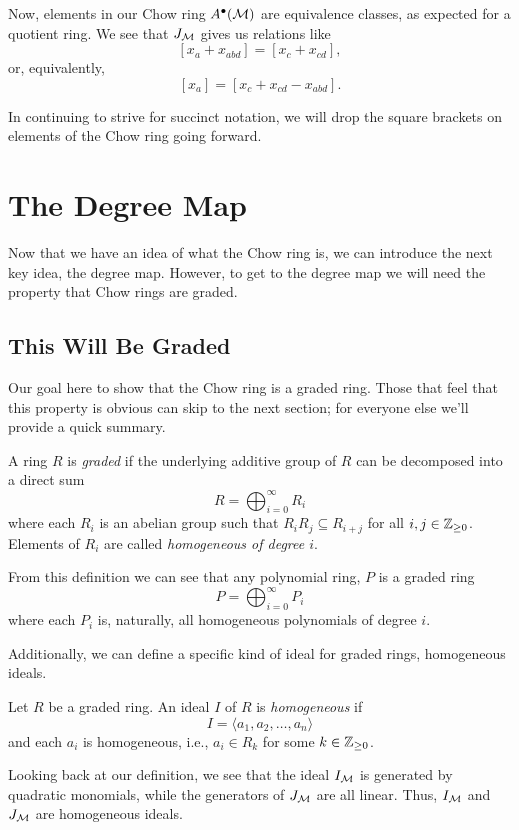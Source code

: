 \documentclass[12pt,oneside]{../../sfsuthesis}
\begin{document}
Now, elements in our Chow ring \( A^\bullet(\mathcal{M}) \) are equivalence classes, as expected for a quotient ring.
We see that \( J_{\mathcal{M}} \) gives us relations like
\[
    [x_a + x_{abd}] = [x_c + x_{cd}],
\]
or, equivalently,
\[
    [x_a] = [x_c + x_{cd} - x_{abd}].
\]

In continuing to strive for succinct notation, we will drop the square brackets on elements of the Chow ring going forward.

\section{The Degree Map}

Now that we have an idea of what the Chow ring is, we can introduce the next key idea, the degree map.
However, to get to the degree map we will need the property that Chow rings are graded.

\subsection{This Will Be Graded}
Our goal here to show that the Chow ring is a graded ring.
Those that feel that this property is obvious can skip to the next section; for everyone else we'll provide a quick summary.
\begin{definition}
    A ring \( R \) is \emph{graded} if the underlying additive group of \( R \) can be decomposed into a direct sum
    \[
        R = \bigoplus_{i=0}^\infty R_i
    \]
    where each \( R_i \) is an abelian group such that \( R_i R_j \subseteq R_{i+j} \) for all \( i, j \in \mathbb{Z}_{\geq 0}\).
    Elements of \( R_i \) are called \emph{homogeneous of degree \( i \)}.
\end{definition}
From this definition we can see that any polynomial ring, \( P \) is a graded ring
\[
    P =  \bigoplus_{i=0}^\infty P_i
\]
where each \( P_i \) is, naturally, all homogeneous polynomials of degree \( i \).

Additionally, we can define a specific kind of ideal for graded rings, homogeneous ideals.
\begin{definition}
    Let \( R \) be a graded ring. An ideal \( I \) of \( R \) is \emph{homogeneous} if
    \[
        I = \langle a_1, a_2, \dots, a_n \rangle
    \]
    and each \( a_i \) is homogeneous, i.e., \( a_i \in R_k \) for some \( k \in \mathbb{Z}_{\geq 0} \).
\end{definition}
Looking back at our definition, we see that the ideal \( I_{\mathcal{M}} \) is generated by quadratic monomials, while the generators of \( J_{\mathcal{M}} \) are all linear.
Thus, \( I_{\mathcal{M}} \) and \( J_{\mathcal{M}} \) are homogeneous ideals.
\end{document}
